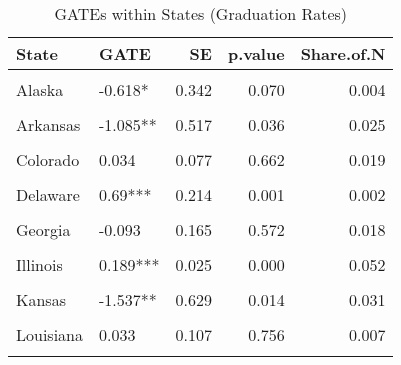 \begin{table}[!h]
\centering
\caption{\label{tab:state_gates_afgr}GATEs within States (Graduation Rates)}
\centering
\begin{tabular}[t]{llrrr}
\toprule
State & GATE & SE & p.value & Share.of.N\\
\midrule
\cellcolor{gray!10}{Alabama} & \cellcolor{gray!10}{0.206***} & \cellcolor{gray!10}{0.039} & \cellcolor{gray!10}{0.000} & \cellcolor{gray!10}{0.012}\\
Alaska & -0.618* & 0.342 & 0.070 & 0.004\\
\cellcolor{gray!10}{Arizona} & \cellcolor{gray!10}{-0.198} & \cellcolor{gray!10}{0.155} & \cellcolor{gray!10}{0.199} & \cellcolor{gray!10}{0.012}\\
Arkansas & -1.085** & 0.517 & 0.036 & 0.025\\
\cellcolor{gray!10}{California} & \cellcolor{gray!10}{-0.054} & \cellcolor{gray!10}{0.057} & \cellcolor{gray!10}{0.339} & \cellcolor{gray!10}{0.046}\\
Colorado & 0.034 & 0.077 & 0.662 & 0.019\\
\cellcolor{gray!10}{Connecticut} & \cellcolor{gray!10}{0.185***} & \cellcolor{gray!10}{0.048} & \cellcolor{gray!10}{0.000} & \cellcolor{gray!10}{0.012}\\
Delaware & 0.69*** & 0.214 & 0.001 & 0.002\\
\cellcolor{gray!10}{Florida} & \cellcolor{gray!10}{0.192***} & \cellcolor{gray!10}{0.071} & \cellcolor{gray!10}{0.007} & \cellcolor{gray!10}{0.007}\\
Georgia & -0.093 & 0.165 & 0.572 & 0.018\\
\cellcolor{gray!10}{Idaho} & \cellcolor{gray!10}{-0.148} & \cellcolor{gray!10}{0.198} & \cellcolor{gray!10}{0.454} & \cellcolor{gray!10}{0.012}\\
Illinois & 0.189*** & 0.025 & 0.000 & 0.052\\
\cellcolor{gray!10}{Indiana} & \cellcolor{gray!10}{0.093***} & \cellcolor{gray!10}{0.029} & \cellcolor{gray!10}{0.002} & \cellcolor{gray!10}{0.032}\\
Kansas & -1.537** & 0.629 & 0.014 & 0.031\\
\cellcolor{gray!10}{Kentucky} & \cellcolor{gray!10}{0.197***} & \cellcolor{gray!10}{0.029} & \cellcolor{gray!10}{0.000} & \cellcolor{gray!10}{0.017}\\
Louisiana & 0.033 & 0.107 & 0.756 & 0.007\\
\cellcolor{gray!10}{Maine} & \cellcolor{gray!10}{0.121***} & \cellcolor{gray!10}{0.020} & \cellcolor{gray!10}{0.000} & \cellcolor{gray!10}{0.012}\\

\end{tabular}
\end{table}
